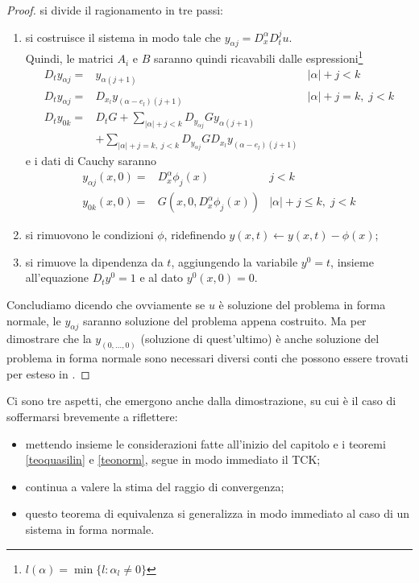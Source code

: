 \begin{proof}
si divide il ragionamento in tre passi:
\begin{enumerate}
\item si costruisce il sistema in modo tale che $y_{\alpha j}= D^\alpha_x D^j_t u$. \\
Quindi, le matrici $A_i$ e $B$ saranno quindi ricavabili dalle espressioni\footnote{$l(\alpha)=\min\{ l:\alpha_l\neq 0 \} $}
\begin{align*}
D_t y_{\alpha j} =& y_{\alpha (j+1)} & |\alpha| + j < k \\
D_t y_{\alpha j} =& D_{x_l} y_{(\alpha-e_l)(j+1)} & |\alpha| + j = k, \; j < k\\
D_t y_{0k} =& D_tG + \sum_{|\alpha|+j < k} D_{y_{\alpha j}}G y_{\alpha (j+1)} \\
& + \sum_{|\alpha|+j = k, \; j < k} D_{y_{\alpha j}} G D_{x_l} y_{(\alpha-e_l)(j+1)}
\end{align*}
e i dati di Cauchy saranno
\begin{align*}
y_{\alpha j}(x, 0) = & D_x^{\alpha} \phi_j(x) & j < k\\
y_{0k}(x, 0) = & G\left( x, 0, D_x^{\alpha} \phi_j(x) \right) & \lvert \alpha \rvert + j \leq k, \; j < k
\end{align*}
\item si rimuovono le condizioni $\phi$, ridefinendo $y(x,t)\leftarrow y(x,t)-\phi (x)$;
\item si rimuove la dipendenza da $t$, aggiungendo la variabile $y^0=t$, insieme all'equazione $D_t y^0=1$ e al dato $y^0(x,0)=0$.
\end{enumerate}
Concludiamo dicendo che ovviamente se $u$ è soluzione del problema in forma normale, le $y_{\alpha j}$ saranno soluzione del problema appena costruito. Ma per dimostrare che la $y_{(0,\ldots,0)}$ (soluzione di quest'ultimo) è anche soluzione del problema in forma normale sono necessari diversi conti che possono essere trovati per esteso in \cite[cap.1]{Folland}.
\end{proof}

\begin{remark}
Ci sono tre aspetti, che emergono anche dalla dimostrazione, su cui è il caso di soffermarsi brevemente a riflettere:
\begin{itemize}
\item mettendo insieme le considerazioni fatte all'inizio del capitolo e i teoremi \ref{teoquasilin} e \ref{teonorm}, segue in modo immediato il TCK;
\item continua a valere la stima del raggio di convergenza;
\item questo teorema di equivalenza si generalizza in modo immediato al caso di un sistema in forma normale.
\end{itemize}
\end{remark}








